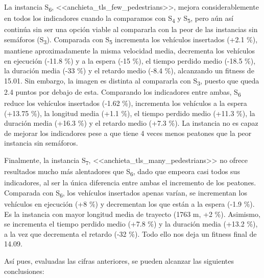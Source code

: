 La instancia S\textsubscript{6}, <<anchieta\_tls\_few\_pedestrians>>, mejora considerablemente en todos los indicadores cuando la comparamos con S\textsubscript{4} y S\textsubscript{5}, pero aún así continúa sin ser una opción viable al compararla con la peor de las instancias sin semáforos (S\textsubscript{3}). Comparada con S\textsubscript{5} incrementa los vehículos insertados (+2.1 \%), mantiene aproximadamente la misma velocidad media, decrementa los vehículos en ejecución (-11.8 \%) y a la espera (-15 \%), el tiempo perdido medio (-18.5 \%), la duración media (-33 \%) y el retardo medio (-8.4 \%), alcanzando un fitness de 15.01. Sin embargo, la imagen es distinta al compararla con S\textsubscript{3}, puesto que queda 2.4 puntos por debajo de esta. Comparando los indicadores entre ambas, S\textsubscript{6} reduce los vehículos insertados (-1.62 \%), incrementa los vehículos a la espera (+13.75 \%), la longitud media (+1.1 \%), el tiempo perdido medio (+11.3 \%), la duración media (+16.3 \%) y el retardo medio (+7.3 \%). La instancia no es capaz de mejorar los indicadores pese a que tiene 4 veces menos peatones que la peor instancia sin semáforos.

Finalmente, la instancia S\textsubscript{7}, <<anchieta\_tls\_many\_pedestrians>> no ofrece resultados mucho más alentadores que S\textsubscript{6}, dado que empeora casi todos sus indicadores, al ser la única diferencia entre ambas el incremento de los peatones. Comparada con S\textsubscript{6}, los vehículos insertados apenas varían, se incrementan los vehículos en ejecución (+8 \%) y decrementan los que están a la espera (-1.9 \%). Es la instancia con mayor longitud media de trayecto (1763 m, +2 \%). Asimismo, se incrementa el tiempo perdido medio (+7.8 \%) y la duración media (+13.2 \%), a la vez que decrementa el retardo (-32 \%). Todo ello nos deja un fitness final de 14.09.

Así pues, evaluadas las cifras anteriores, se pueden alcanzar las siguientes conclusiones:

